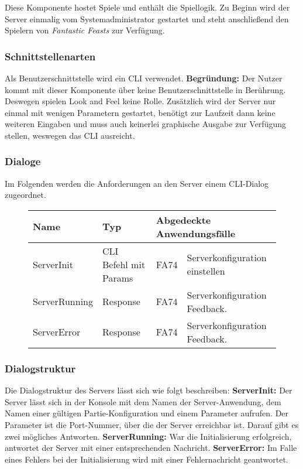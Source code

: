Diese Komponente hostet Spiele und enthält die Spiellogik. Zu Beginn wird der Server einmalig vom Systemadministrator gestartet und steht anschließend den Spielern von \textit{Fantastic Feasts} zur Verfügung.

\subsubsection{Schnittstellenarten}
Als Benutzerschnittstelle wird ein CLI verwendet. \textbf{Begründung:} Der Nutzer kommt mit dieser Komponente über keine Benutzerschnittstelle in Berührung. Deswegen spielen Look and Feel keine Rolle. Zusätzlich wird der Server nur einmal mit wenigen Parametern gestartet, benötigt zur Laufzeit dann keine weiteren Eingaben und muss auch keinerlei graphische Ausgabe zur Verfügung stellen, weswegen das CLI ausreicht.

\subsubsection{Dialoge}
Im Folgenden werden die Anforderungen an den Server einem CLI-Dialog zugeordnet.

\begin{figure}[H]
    \centering
    \begin{tabular}{| l l l l |}
    \hline
    \textbf{Name} & \textbf{Typ} & \multicolumn{2}{l|}{\textbf{Abgedeckte Anwendungsfälle}} \\\hline
    ServerInit & CLI Befehl mit Params & FA74 & Serverkonfiguration einstellen \\\hline
    ServerRunning & Response & FA74 & Serverkonfiguration Feedback.\\\hline
    ServerError & Response & FA74 & Serverkonfiguration Feedback.\\\hline
    
    \end{tabular}
\end{figure}

\subsubsection{Dialogstruktur}  
Die Dialogstruktur des Servers lässt sich wie folgt beschreiben: \textbf{ServerInit:} Der Server lässt sich in der Konsole mit dem Namen der Server-Anwendung, dem Namen einer gültigen Partie-Konfiguration und einem Parameter aufrufen. Der Parameter ist die Port-Nummer, über die der Server erreichbar ist. Darauf gibt es zwei mögliches Antworten. \textbf{ServerRunning:} War die Initialisierung erfolgreich, antwortet der Server mit einer entsprechenden Nachricht. \textbf{ServerError:} Im Falle eines Fehlers bei der Initialisierung wird mit einer Fehlernachricht geantwortet.
